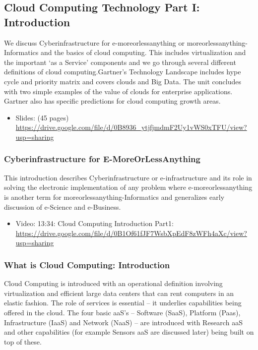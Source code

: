 \subsection{Cloud Computing Technology Part I:
Introduction}\label{cloud-computing-technology-part-i-introduction}

We discuss Cyberinfrastructure for e-moreorlessanything or
moreorlessanything-Informatics and the basics of cloud computing. This
includes virtualization and the important `as a Service' components and
we go through several different definitions of cloud computing.Gartner's
Technology Landscape includes hype cycle and priority matrix and covers
clouds and Big Data. The unit concludes with two simple examples of the
value of clouds for enterprise applications. Gartner also has specific
predictions for cloud computing growth areas.

\begin{itemize}
\tightlist
\item
  Slides: (45 pages)
  \url{https://drive.google.com/file/d/0B8936_ytjfjmdmF2Uy1vWS0xTFU/view?usp=sharing}
\end{itemize}

\subsubsection{Cyberinfrastructure for
E-MoreOrLessAnything}\label{cyberinfrastructure-for-e-moreorlessanything}

This introduction describes Cyberinfrastructure or e-infrastructure and
its role in solving the electronic implementation of any problem where
e-moreorlessanything is another term for moreorlessanything-Informatics
and generalizes early discussion of e-Science and e-Business.

\begin{itemize}
\tightlist
\item
  Video: 13:34: Cloud Computing Introduction Part1:
  \url{https://drive.google.com/file/d/0B1Of61fJF7WsbXpEdF8zWFh4aXc/view?usp=sharing}
\end{itemize}

\subsubsection{What is Cloud Computing:
Introduction}\label{what-is-cloud-computing-introduction}

Cloud Computing is introduced with an operational definition involving
virtualization and efficient large data centers that can rent computers
in an elastic fashion. The role of services is essential -- it underlies
capabilities being offered in the cloud. The four basic aaS's --
Software (SaaS), Platform (Paas), Infrastructure (IaaS) and Network
(NaaS) -- are introduced with Research aaS and other capabilities (for
example Sensors aaS are discussed later) being built on top of these.

